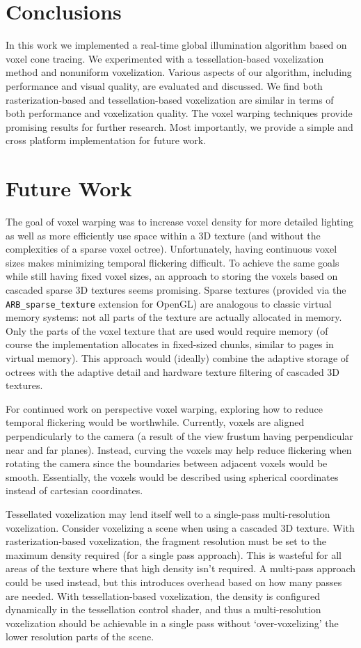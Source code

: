 \section{Conclusions}
In this work we implemented a real-time global illumination algorithm based on voxel cone tracing. We experimented with a tessellation-based voxelization method and nonuniform voxelization. Various aspects of our algorithm, including performance and visual quality, are evaluated and discussed. We find both rasterization-based and tessellation-based voxelization are similar in terms of both performance and voxelization quality. The voxel warping techniques provide promising results for further research. Most importantly, we provide a simple and cross platform implementation for future work.

\section{Future Work}
The goal of voxel warping was to increase voxel density for more detailed lighting as well as more efficiently use space within a 3D texture (and without the complexities of a sparse voxel octree). Unfortunately, having continuous voxel sizes makes minimizing temporal flickering difficult. To achieve the same goals while still having fixed voxel sizes, an approach to storing the voxels based on cascaded sparse 3D textures seems promising. Sparse textures (provided via the \verb#ARB_sparse_texture# extension for OpenGL) are analogous to classic virtual memory systems: not all parts of the texture are actually allocated in memory. Only the parts of the voxel texture that are used would require memory (of course the implementation allocates in fixed-sized chunks, similar to pages in virtual memory). This approach would (ideally) combine the adaptive storage of octrees with the adaptive detail and hardware texture filtering of cascaded 3D textures.

For continued work on perspective voxel warping, exploring how to reduce temporal flickering would be worthwhile. Currently, voxels are aligned perpendicularly to the camera (a result of the view frustum having perpendicular near and far planes). Instead, curving the voxels may help reduce flickering when rotating the camera since the boundaries between adjacent voxels would be smooth. Essentially, the voxels would be described using spherical coordinates instead of cartesian coordinates.

Tessellated voxelization may lend itself well to a single-pass multi-resolution voxelization. Consider voxelizing a scene when using a cascaded 3D texture. With rasterization-based voxelization, the fragment resolution must be set to the maximum density required (for a single pass approach). This is wasteful for all areas of the texture where that high density isn't required. A multi-pass approach could be used instead, but this introduces overhead based on how many passes are needed. With tessellation-based voxelization, the density is configured dynamically in the tessellation control shader, and thus a multi-resolution voxelization should be achievable in a single pass without `over-voxelizing' the lower resolution parts of the scene.

